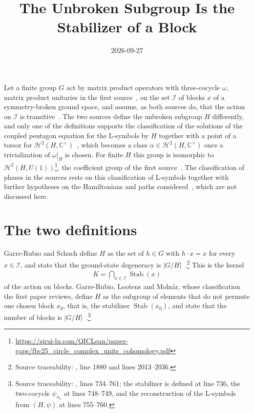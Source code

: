 \documentclass{article}
\title{The Unbroken Subgroup Is the Stabilizer of a Block}
\author{}
\date{2026-09-27}
\begin{document}
\maketitle
{}

Let a finite group $G$ act by matrix product operators with three-cocycle
$\omega$, matrix product unitaries in the first
source~\cite{GarreRubioSchuch2024DomainWall}, on the set $\mathcal I$ of blocks $x$ of a symmetry-broken ground space,
and assume, as both sources do, that the action on $\mathcal I$ is
transitive~\cite{GarreRubio2023MPOSym,GarreRubioSchuch2024DomainWall}.
The two sources define the unbroken subgroup $H$ differently, and only one of
the definitions supports the classification of the solutions of the coupled
pentagon equation for the L-symbols by $H$ together with a point of a torsor
for $\mathcal H^2(H,\mathbb C^\times)$~\cite{GarreRubio2023MPOSym}, which becomes a class
$\alpha\in\mathcal H^2(H,\mathbb C^\times)$ once a trivialization of
$\omega|_H$ is chosen. For finite $H$ this group is isomorphic to
$\mathcal H^2(H,U(1))$\footnote{\url{https://sirui-lu.com/QICLean/paper-gaps/fbc25_circle_complex_units_cohomology.pdf}}, the
coefficient group of the first
source~\cite{GarreRubioSchuch2024DomainWall}. The
classification of phases in the sources rests on this classification of
L-symbols together with further hypotheses on the Hamiltonians and paths
considered~\cite{GarreRubio2023MPOSym,GarreRubioSchuch2024DomainWall}, which
are not discussed here.

\section{The two definitions}

Garre-Rubio and Schuch define $H$ as the set of $h\in G$ with $h\cdot x=x$ for
every $x\in\mathcal I$, and state that the ground-state degeneracy is
$|G/H|$~\cite{GarreRubioSchuch2024DomainWall}.\footnote{Source traceability:
    , line 1880 and lines 2013--2036.} This
is the kernel
\begin{align}
    K=\bigcap_{x\in\mathcal I}\operatorname{Stab}(x)
    \label{eq:gs24_kernel}
\end{align}
of the action on blocks. Garre-Rubio, Lootens and Moln\'ar, whose
classification the first paper reviews, define $H$ as the subgroup of elements
that do not permute one chosen block $x_0$, that is, the stabilizer
$\operatorname{Stab}(x_0)$, and state that the number of blocks is
$|G/H|$~\cite{GarreRubio2023MPOSym}.\footnote{Source traceability:
    , lines 734--761; the stabilizer is
    defined at line 736, the two-cocycle $\psi_{x_0}$ at lines 748--749, and the
    reconstruction of the L-symbols from $(H,\psi)$ at lines 755--760.}
\end{document}

